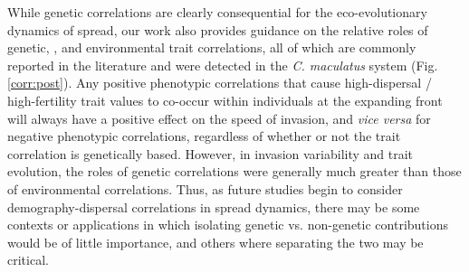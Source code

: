 \documentclass[11pt]{article}
\newcommand{\revise}[1]{{\color{Mahogany}{#1}}}
\begin{document}
While genetic correlations are clearly consequential for the eco-evolutionary dynamics of spread, our work also provides guidance on the relative roles of genetic, \revise{maternal}, and environmental trait correlations, all of which are commonly reported in the literature and were detected in the \textit{C. maculatus} system (Fig. \ref{corr:post}).
Any positive phenotypic correlations that cause high-dispersal / high-fertility trait values to co-occur within individuals at the expanding front will always have a positive effect on the speed of invasion, and \textit{vice versa} for negative phenotypic correlations, regardless of whether or not the trait correlation is genetically based.
However, in invasion variability and trait evolution, the roles of genetic correlations were generally much greater than those of environmental correlations.
Thus, as future studies begin to consider demography-dispersal correlations in spread dynamics, there may be some contexts or applications in which isolating genetic vs. non-genetic contributions would be of little importance, and others where separating the two may be critical.
\end{document}
